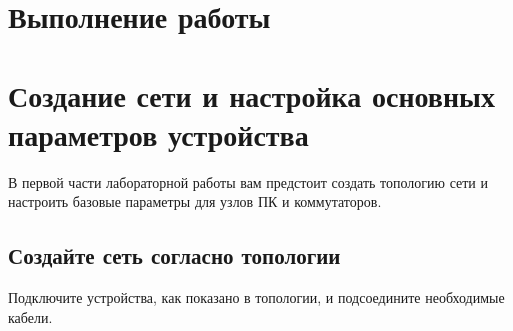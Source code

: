 \section*{\LARGE Выполнение работы}

\section{Создание сети и настройка основных параметров устройства}

В первой части лабораторной работы вам предстоит создать топологию сети и настроить базовые
параметры для узлов ПК и коммутаторов.

\subsection{Создайте сеть согласно топологии}
Подключите устройства, как показано в топологии, и подсоедините необходимые кабели.

